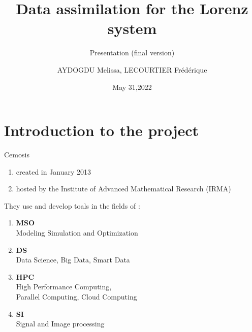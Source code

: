 \documentclass[10pt,xcolor={table,dvipsnames},t]{beamer}
\title[Lorenz]{Data assimilation for the Lorenz system}
\subtitle{Presentation (final version)}
\author[name]{AYDOGDU Melissa, LECOURTIER Frédérique}
\institute{\large Strasbourg University}
\date{May 31,2022}
\begin{document}
	
	\begin{frame}
		\titlepage
	\end{frame}
	
	\AtBeginSection[]{
		\begin{frame}
			\vfill
			\centering
			\begin{beamercolorbox}[sep=5pt,shadow=true,rounded=true]{subtitle}
				\usebeamerfont{title}\insertsectionhead\par%
			\end{beamercolorbox}
			\vfill
		\end{frame}
	}


	\section{Introduction to the project}

	\begin{frame}{Cemosis}
		
		\begin{minipage}{0.4\hsize}
			\centering
			\begin{enumerate}[$\rightarrow$]
				\item created in January 2013
				\item hosted by the Institute of Advanced Mathematical Research (IRMA)
			\end{enumerate}
		\end{minipage} \quad
		\begin{minipage}{0.5\hsize}
			They use and develop toals in the fields of : 
			\begin{enumerate}[\textbullet]
				\item \textbf{MSO} \\
				Modeling Simulation and Optimization
				\item \textbf{DS} \\
				Data Science, Big Data, Smart Data
				\item \textbf{HPC} \\
				High Performance Computing, \\
				Parallel Computing, Cloud Computing
				\item \textbf{SI} \\
				Signal and Image processing
			\end{enumerate}
		\end{minipage}
	
	\end{frame}
\end{document}
